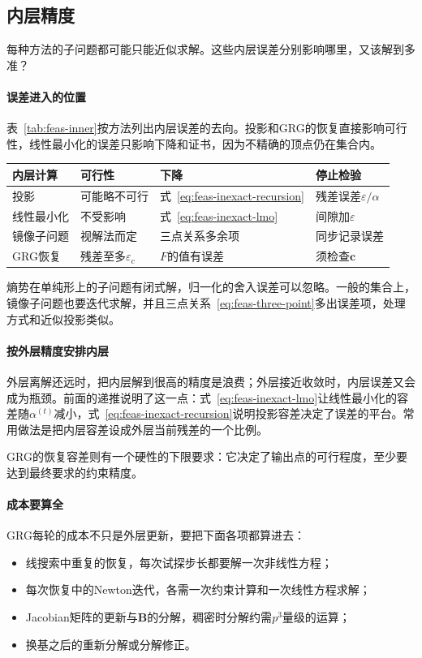 \subsection{内层精度}
\label{sec:feas-compare-inner}

每种方法的子问题都可能只能近似求解。这些内层误差分别影响哪里，又该解到多准？

\paragraph{误差进入的位置}
表~\ref{tab:feas-inner}按方法列出内层误差的去向。投影和GRG的恢复直接影响可行性，线性最小化的误差只影响下降和证书，因为不精确的顶点仍在集合内。

\begin{BookInlineTable}
  \centering
  \caption{内层误差的影响。}
  \label{tab:feas-inner}
  \begin{tabular}{llll}
   \toprule
   内层计算 & 可行性 & 下降 & 停止检验\\
   \midrule
   投影 & 可能略不可行 & 式~\eqref{eq:feas-inexact-recursion} & 残差误差$\varepsilon/\alpha$\\
   线性最小化 & 不受影响 & 式~\eqref{eq:feas-inexact-lmo} & 间隙加$\varepsilon$\\
   镜像子问题 & 视解法而定 & 三点关系多余项 & 同步记录误差\\
   GRG恢复 & 残差至多$\varepsilon_c$ & $F$的值有误差 & 须检查$\bm{c}$\\
   \bottomrule
  \end{tabular}
\end{BookInlineTable}

熵势在单纯形上的子问题有闭式解，归一化的舍入误差可以忽略。一般的集合上，镜像子问题也要迭代求解，并且三点关系~\eqref{eq:feas-three-point}多出误差项，处理方式和近似投影类似。

\paragraph{按外层精度安排内层}
外层离解还远时，把内层解到很高的精度是浪费；外层接近收敛时，内层误差又会成为瓶颈。前面的递推说明了这一点：式~\eqref{eq:feas-inexact-lmo}让线性最小化的容差随$\alpha^{(t)}$减小，式~\eqref{eq:feas-inexact-recursion}说明投影容差决定了误差的平台。常用做法是把内层容差设成外层当前残差的一个比例。

GRG的恢复容差则有一个硬性的下限要求：它决定了输出点的可行程度，至少要达到最终要求的约束精度。

\paragraph{成本要算全}
GRG每轮的成本不只是外层更新，要把下面各项都算进去：
\begin{itemize}
 \item 线搜索中重复的恢复，每次试探步长都要解一次非线性方程；
 \item 每次恢复中的Newton迭代，各需一次约束计算和一次线性方程求解；
 \item Jacobian矩阵的更新与$\bm{B}$的分解，稠密时分解约需$p^3$量级的运算；
 \item 换基之后的重新分解或分解修正。
\end{itemize}

